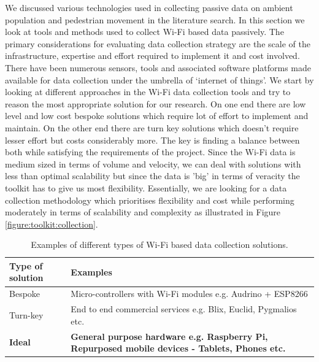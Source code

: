 We discussed various technologies used in collecting passive data on ambient population and pedestrian movement in the literature search.
In this section we look at tools and methods used to collect Wi-Fi based data passively.
The primary considerations for evaluating data collection strategy are the scale of the infrastructure, expertise and effort required to implement it and cost involved.
There have been numerous sensors, tools and associated software platforms made available for data collection under the umbrella of `internet of things'.
We start by looking at different approaches in the Wi-Fi data collection tools and try to reason the most appropriate solution for our research.
On one end there are low level and low cost bespoke solutions which require lot of effort to implement and maintain.
On the other end there are turn key solutions which doesn't require lesser effort but costs considerably more.
The key is finding a balance between both while satisfying the requirements of the project.
Since the Wi-Fi data is medium sized in terms of volume and velocity, we can deal with solutions with less than optimal scalability but since the data is 'big' in terms of veracity the toolkit has to give us most flexibility. 
Essentially, we are looking for a data collection methodology which prioritises flexibility and cost while performing moderately in terms of scalability and complexity as illustrated in Figure \ref{figure:toolkit:collection}.

\begin{table}[h]
  \footnotesize
  \begin{center}
    \begin{tabular}{lp{5cm}}
      \toprule
      Type of solution & Examples\\
      \midrule
      Bespoke & Micro-controllers with Wi-Fi modules e.g. Audrino + ESP8266\\
      Turn-key & End to end commercial services e.g. Blix, Euclid, Pygmalios etc.\\ 
      \textbf{Ideal} & \textbf{General purpose hardware e.g. Raspberry Pi, Repurposed mobile devices - Tablets, Phones etc.}\\
      \bottomrule
    \end{tabular}
  \end{center}
  \caption{Examples of different types of Wi-Fi based data collection solutions.}
  \label{table:toolkit:collection}
\end{table}

